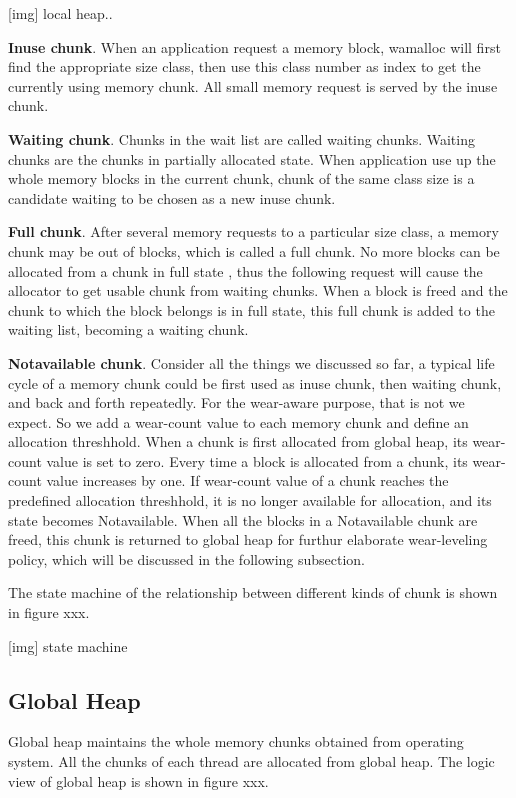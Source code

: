 \documentclass{vldb}
\begin{document}
[img] local heap..

\textbf{Inuse chunk}. When an application request a memory block, wamalloc will first find the appropriate size class, then use this class number as index to get the currently using memory chunk. 
All small memory request is served by the inuse chunk.

\textbf{Waiting chunk}. Chunks in the wait list are called waiting chunks. Waiting chunks are the chunks in partially allocated state. 
When application use up the whole memory blocks in the current chunk, chunk of the same class size is a candidate waiting to be chosen as a new inuse chunk.

\textbf{Full chunk}. After several memory requests to a particular size class, a memory chunk may be out of blocks, which is called a full chunk.
No more blocks can be allocated from a chunk in full state , thus the following request will cause the allocator to get usable chunk from waiting chunks.
When a block is freed and the chunk to which the block belongs is in full state, this full chunk is added to the waiting list, becoming a waiting chunk.

\textbf{Notavailable chunk}. Consider all the things we discussed so far, a typical life cycle of a memory chunk could be first used as inuse chunk, then waiting chunk, and back and forth repeatedly. 
For the wear-aware purpose, that is not we expect. 
So we add a wear-count value to each memory chunk and define an allocation threshhold. 
When a chunk is first allocated from global heap, its wear-count value is set to zero.
Every time a block is allocated from a chunk, its wear-count value increases by one. 
If wear-count value of a chunk reaches the predefined allocation threshhold, it is no longer available for allocation, and its state becomes Notavailable. 
When all the blocks in a Notavailable chunk are freed, this chunk is returned to global heap for furthur elaborate wear-leveling policy, which will be discussed in the following subsection.

The state machine of the relationship between different kinds of chunk is shown in figure xxx.

[img] state machine

\subsection{Global Heap}

Global heap maintains the whole memory chunks obtained from operating system. 
All the chunks of each thread are allocated from global heap. 
The logic view of global heap is shown in figure xxx.
\end{document}
